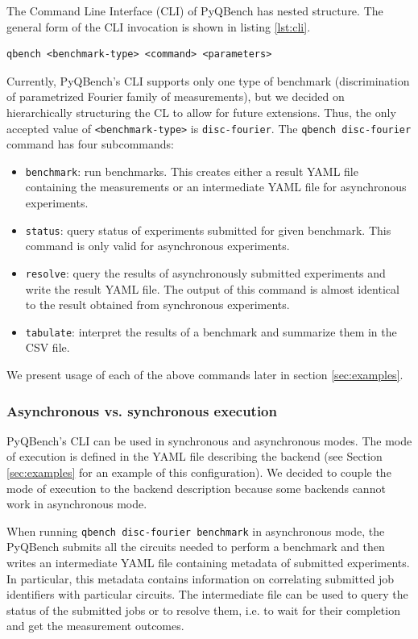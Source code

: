 \documentclass[preprint,12pt, a4paper, dvipsnames]{elsarticle}
\newcommand{\1}{{\rm 1\hspace{-0.9mm}l}}
\theoremstyle{definition}
\begin{document}
The Command Line Interface (CLI) of PyQBench has nested structure. The general form of the CLI
invocation is shown in listing \ref{lst:cli}.
\begin{lstlisting}[caption=Invocation of \texttt{qbench} script, label=lst:cli]
qbench <benchmark-type> <command> <parameters>
\end{lstlisting}
Currently, PyQBench's CLI supports only one type of benchmark (discrimination of parametrized
Fourier family of measurements), but we decided on hierarchically structuring the CL to allow for
future extensions. Thus, the only accepted value of \texttt{<benchmark-type>} is
\texttt{disc-fourier}.
%
The \texttt{qbench disc-fourier} command has four subcommands:

\begin{itemize}
	\item \texttt{benchmark}: run benchmarks. This creates either a result YAML file containing the
		measurements or an intermediate YAML file for asynchronous experiments.
	\item \texttt{status}: query status of experiments submitted for given benchmark. This command
		is only valid for asynchronous experiments.
	\item \texttt{resolve}: query the results of asynchronously submitted experiments and write the
		result YAML file. The output of this command is almost identical to the result obtained from
		synchronous experiments.
	\item \texttt{tabulate}: interpret the results of a benchmark and summarize them in the CSV
	file.
\end{itemize}
%
We present usage of each of the above commands later in section \ref{sec:examples}.

\subsubsection{Asynchronous vs. synchronous execution}
PyQBench's CLI can be used in synchronous and asynchronous modes. The mode of execution is defined
in the YAML file describing the backend (see Section \ref{sec:examples} for an example of this
configuration). We decided to couple the mode of execution to the backend description because some
backends cannot work in asynchronous mode.

When running \texttt{qbench disc-fourier benchmark} in asynchronous mode, the PyQBench submits all
the circuits needed to perform a benchmark and then writes an intermediate YAML file containing
metadata of submitted experiments. In particular, this metadata contains information on correlating
submitted job identifiers with particular circuits. The intermediate file can be used to query the
status of the submitted jobs or to resolve them, i.e. to wait for their completion and get the
measurement outcomes.
\end{document}
